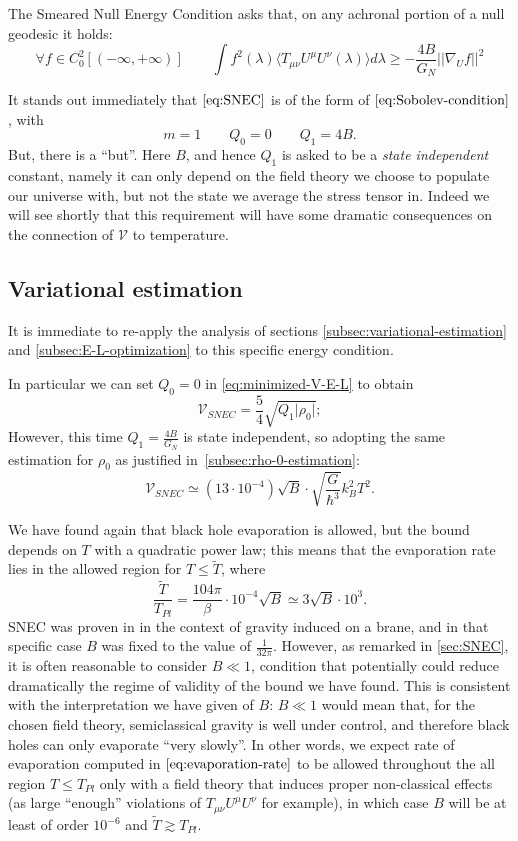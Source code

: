 \begin{definition}
	The Smeared Null Energy Condition asks that, on any achronal portion of a null geodesic it holds:
	\begin{equation}
		\label{eq:SNEC}
		\forall f \in C_0^2[(-\infty, +\infty)] \quad\quad \int f^2(\lambda)\langle T_{\mu\nu}U^{\mu}U^{\nu}(\lambda) \rangle d\lambda \ge -\frac{4B}{G_N}\vert\vert \nabla_U f\vert\vert^2
	\end{equation}
\end{definition}

It stands out immediately that \(\eqref{eq:SNEC}\) is of the form of \(\eqref{eq:Sobolev-condition}\), with 
\[
m = 1 \quad \quad Q_0 = 0 \quad \quad Q_1 = 4B.	
\]
But, there is a ``but''. Here \(B\), and hence \(Q_1\) is asked to be a \emph{state independent} constant, namely it can only depend on the field theory we choose to populate our universe with, but not the state we average the stress tensor in. 
Indeed we will see shortly that this requirement will have some dramatic consequences on the connection of \(\mathcal{V}\) to temperature.

\subsection{Variational estimation}
It is immediate to re-apply the analysis of sections \ref{subsec:variational-estimation} and \ref{subsec:E-L-optimization} to this specific energy condition.

In particular we can set \(Q_0 = 0\) in \eqref{eq:minimized-V-E-L} to obtain
\[
	\mathcal{V}_{SNEC} = \frac{5}{4}\sqrt{Q_1\vert\rho_0\vert};
\]
However, this time \(Q_1 = \frac{4B}{G_N}\) is state independent, so adopting the same estimation for \(\rho_0\) as justified in~\ref{subsec:rho-0-estimation}:
\[
\mathcal{V}_{SNEC} \simeq (13\cdot 10^{- 4})\sqrt{B} \cdot \sqrt{\frac{G}{\hbar^3}}k_B^2T^2.	
\] 

We have found again that black hole evaporation is allowed, but the bound depends on \(T\) with a quadratic power law; this means that the evaporation rate lies in the allowed region for \(T \le \tilde{T}\), where
\[
\frac{\tilde{T}}{T_{Pl}} = \frac{104\pi}{\beta}\cdot 10^{-4}\sqrt{B} \simeq 3\sqrt{B} \cdot 10^3.
\]
SNEC was proven in \cite{leichenauer2019upper} in the context of gravity induced on a brane, and in that specific case \(B\) was fixed to the value of \(\frac{1}{32\pi}\). However, as remarked in \ref{sec:SNEC}, it is often reasonable to consider \(B\ll 1\), condition that potentially could reduce dramatically the regime of validity of the bound we have found. This is consistent with the interpretation we have given of \(B\): \(B \ll 1\) would mean that, for the chosen field theory, semiclassical gravity is well under control, and therefore black holes can only evaporate ``very slowly''. 
\noindent
In other words, we expect rate of evaporation computed in \(\eqref{eq:evaporation-rate}\) to be allowed throughout the all region \(T\le T_{Pl}\) only with a field theory that induces proper non-classical effects (as large ``enough'' violations of \(T_{\mu\nu}U^{\mu}U^{\nu}\) for example), in which case \(B\) will be at least of order \(10^{-6}\) and \(\tilde{T} \gtrsim T_{Pl}\).

